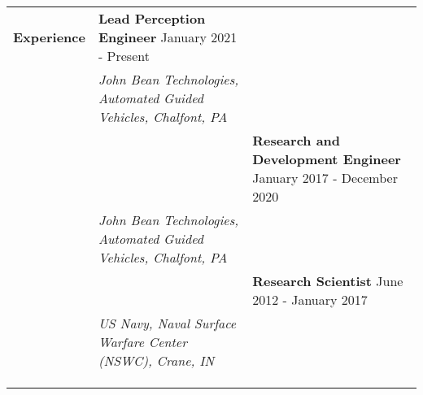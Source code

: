\begin{tabular}{L{\hlcolw}  L{\rcolw}}
\textbf{\Large Experience} & \textbf{\large Lead Perception Engineer} \hfill {\large January 2021 - Present}  
\vspace{0.05in} 
\\
& \textit{\large John Bean Technologies, Automated Guided Vehicles, Chalfont, PA} \\ 
&
\vspace{-0.2in} 

& \textbf{\large Research and Development Engineer} \hfill {\large January 2017 - December 2020}  
\vspace{0.05in} 
\\
& \textit{\large John Bean Technologies, Automated Guided Vehicles, Chalfont, PA} \\ 
&
\vspace{-0.2in} 


& \textbf{\large Research Scientist} \hfill {\large June 2012 - January 2017}  
\vspace{0.05in} \\
& \textit{\large US Navy, Naval Surface Warfare Center (NSWC), Crane, IN} \\ 
&
\vspace{-0.2in} 

\\

\\
	\hline 
	\hline \\  
\end{tabular}
